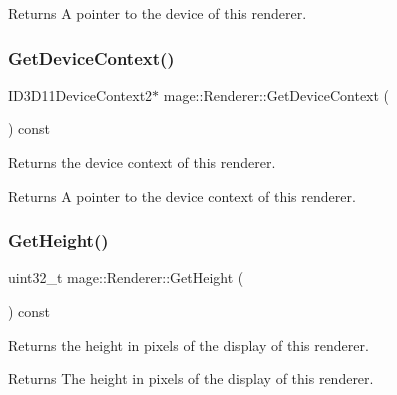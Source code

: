 \begin{DoxyReturn}{Returns}
A pointer to the device of this renderer. 
\end{DoxyReturn}
\hypertarget{classmage_1_1_renderer_a13df5f31b3d18d2f4428743ebd7ffbe5}{}\label{classmage_1_1_renderer_a13df5f31b3d18d2f4428743ebd7ffbe5} 
\subsubsection{\texorpdfstring{Get\+Device\+Context()}{GetDeviceContext()}}
{\footnotesize\ttfamily I\+D3\+D11\+Device\+Context2$\ast$ mage\+::\+Renderer\+::\+Get\+Device\+Context (\begin{DoxyParamCaption}{ }\end{DoxyParamCaption}) const\hspace{0.3cm}{\ttfamily [noexcept]}}

Returns the device context of this renderer.

\begin{DoxyReturn}{Returns}
A pointer to the device context of this renderer. 
\end{DoxyReturn}
\hypertarget{classmage_1_1_renderer_adc6940516d809d1916c627d6ce3837fe}{}\label{classmage_1_1_renderer_adc6940516d809d1916c627d6ce3837fe} 
\subsubsection{\texorpdfstring{Get\+Height()}{GetHeight()}}
{\footnotesize\ttfamily uint32\+\_\+t mage\+::\+Renderer\+::\+Get\+Height (\begin{DoxyParamCaption}{ }\end{DoxyParamCaption}) const\hspace{0.3cm}{\ttfamily [noexcept]}}

Returns the height in pixels of the display of this renderer.

\begin{DoxyReturn}{Returns}
The height in pixels of the display of this renderer. 
\end{DoxyReturn}
\hypertarget{classmage_1_1_renderer_a4259de775cde2ce71b426f8e88a3afe2}{}\label{classmage_1_1_renderer_a4259de775cde2ce71b426f8e88a3afe2} 

